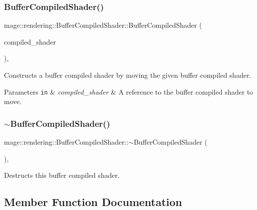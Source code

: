 \subsubsection{\texorpdfstring{Buffer\+Compiled\+Shader()}{BufferCompiledShader()}\hspace{0.1cm}{\footnotesize\ttfamily [3/3]}}
{\footnotesize\ttfamily mage\+::rendering\+::\+Buffer\+Compiled\+Shader\+::\+Buffer\+Compiled\+Shader (\begin{DoxyParamCaption}\item[{\mbox{\hyperlink{classmage_1_1rendering_1_1_buffer_compiled_shader}{Buffer\+Compiled\+Shader}} \&\&}]{compiled\+\_\+shader }\end{DoxyParamCaption})\hspace{0.3cm}{\ttfamily [default]}, {\ttfamily [noexcept]}}

Constructs a buffer compiled shader by moving the given buffer compiled shader.


\begin{DoxyParams}[1]{Parameters}
\mbox{\tt in}  & {\em compiled\+\_\+shader} & A reference to the buffer compiled shader to move. \\
\hline
\end{DoxyParams}
\mbox{\label{classmage_1_1rendering_1_1_buffer_compiled_shader_af989fa0356f17de9dd75b76aace3f106}} 
\subsubsection{\texorpdfstring{$\sim$\+Buffer\+Compiled\+Shader()}{~BufferCompiledShader()}}
{\footnotesize\ttfamily mage\+::rendering\+::\+Buffer\+Compiled\+Shader\+::$\sim$\+Buffer\+Compiled\+Shader (\begin{DoxyParamCaption}{ }\end{DoxyParamCaption})\hspace{0.3cm}{\ttfamily [virtual]}, {\ttfamily [default]}}

Destructs this buffer compiled shader. 

\subsection{Member Function Documentation}
\mbox{\label{classmage_1_1rendering_1_1_buffer_compiled_shader_a0887622bd25db8698c572d0dc46167b9}} 
